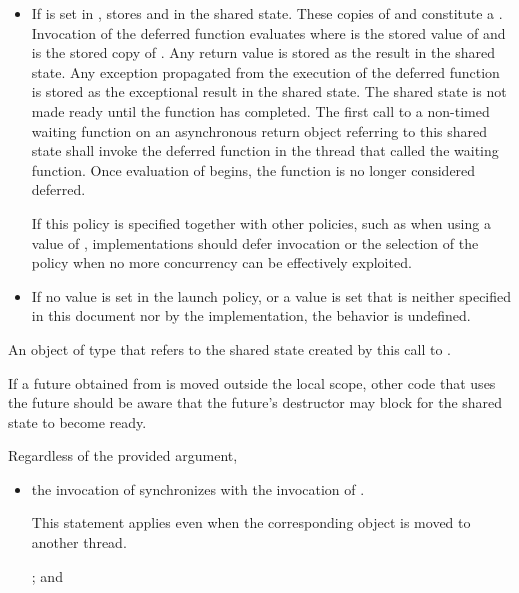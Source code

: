\begin{itemdescr}
\begin{itemize}
\item
If  is set in ,
stores  and
in the shared state. These copies of  and  constitute
a . Invocation of the deferred function evaluates
 where  is the stored value of
 and  is the stored copy of
.
Any return value is stored
as the result in the shared state.
Any exception propagated
from the execution
of the deferred function
is stored as the exceptional result
in the shared state.
The shared state is not
made ready until the function has completed. The first call to a
non-timed waiting function
on an asynchronous return object referring to
this shared state shall invoke the
deferred function in the thread that called the waiting function.
Once evaluation of  begins, the function is no longer
considered deferred.
\begin{note}
If this policy is specified together with other policies, such as when using a
 value of , implementations should defer
invocation or the selection of the policy when no more concurrency can be effectively
exploited.
\end{note}

\item
If no value is set in the launch policy, or a value is set that is neither specified
in this document nor by the implementation, the behavior is undefined.
\end{itemize}

\pnum
\returns
An object of type
 that refers
to the shared state created by this call to .
\begin{note}
If a future obtained from  is moved outside the local scope,
other code that uses the future should be aware that the future's destructor may
block for the shared state to become ready.
\end{note}

\pnum
\sync
Regardless of the provided  argument,
\begin{itemize}
\item
the invocation of 
synchronizes with the invocation of .
\begin{note}
This statement applies even when the corresponding  object is moved to
another thread.
\end{note}
; and


\end{itemize}
\end{itemdescr}
